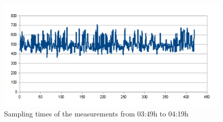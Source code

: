\begin{figure}[tbp]
	\centering
	\includegraphics[scale=0.75]{content/images/Experiment/NightRounds}
 	\caption{Sampling times of the measurements from 03:49h to 04:19h}
	\label{fig:nightR}
\end{figure}

